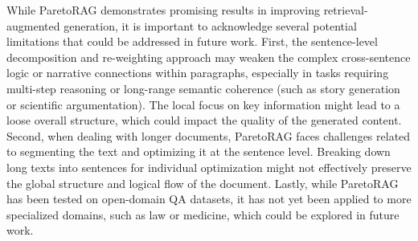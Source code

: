 While ParetoRAG demonstrates promising results in improving retrieval-augmented generation, it is important to acknowledge several potential limitations that could be addressed in future work. First, the sentence-level decomposition and re-weighting approach may weaken the complex cross-sentence logic or narrative connections within paragraphs, especially in tasks requiring multi-step reasoning or long-range semantic coherence (such as story generation or scientific argumentation). The local focus on key information might lead to a loose overall structure, which could impact the quality of the generated content. Second, when dealing with longer documents, ParetoRAG faces challenges related to segmenting the text and optimizing it at the sentence level. Breaking down long texts into sentences for individual optimization might not effectively preserve the global structure and logical flow of the document. Lastly, while ParetoRAG has been tested on open-domain QA datasets, it has not yet been applied to more specialized domains, such as law or medicine, which could be explored in future work.